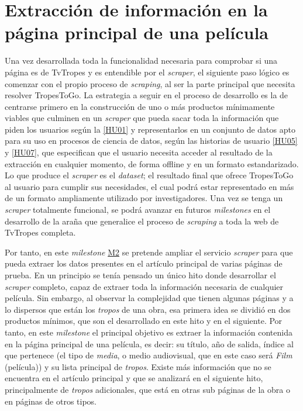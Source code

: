 \section{Extracción de información en la página principal de una película}
Una vez desarrollada toda la funcionalidad necesaria para comprobar si una
página es de TvTropes y es entendible por el \textit{scraper}, el siguiente paso
lógico es comenzar con el propio proceso de \textit{scraping}, al ser la parte
principal que necesita resolver TropesToGo. La estrategia a seguir en el proceso
de desarrollo es la de centrarse primero en la construcción de uno o más
productos mínimamente viables que culminen en un \textit{scraper} que pueda
sacar toda la información que piden los usuarios según la
\href{https://github.com/jlgallego99/TropesToGo/issues/6}{[HU01]} y
representarlos en un conjunto de datos apto para su uso en procesos de ciencia
de datos, según las historias de usuario
\href{https://github.com/jlgallego99/TropesToGo/issues/30}{[HU05]} y
\href{https://github.com/jlgallego99/TropesToGo/issues/46}{[HU07]}, que
especifican que el usuario necesita acceder al resultado de la extracción en
cualquier momento, de forma offline y en un formato estandarizado. Lo que
produce el \textit{scraper} es el \textit{dataset}; el resultado final que
ofrece TropesToGo al usuario para cumplir sus necesidades, el cual podrá estar
representado en más de un formato ampliamente utilizado por investigadores. Una
vez se tenga un \textit{scraper} totalmente funcional, se podrá avanzar en
futuros \textit{milestones} en el desarrollo de la araña que generalice el
proceso de \textit{scraping} a toda la web de TvTropes completa. 

Por tanto, en este \textit{milestone}
\href{https://github.com/jlgallego99/TropesToGo/milestone/3}{M2} se pretende
ampliar el servicio \textit{scraper} para que pueda extraer los datos presentes
en el artículo principal de varias páginas de prueba. En un principio se tenía
pensado un único hito donde desarrollar el \textit{scraper} completo, capaz de
extraer toda la información necesaria de cualquier película. Sin embargo, al
observar la complejidad que tienen algunas páginas y a lo dispersos que están
los \textit{tropos} de una obra, esa primera idea se dividió en dos productos
mínimos, que son el desarrollado en este hito y en el siguiente. Por tanto, en
este \textit{milestone} el principal objetivo es extraer la información
contenida en la página principal de una película, es decir: su título, año de
salida, índice al que pertenece (el tipo de \textit{media}, o medio audiovisual,
que en este caso será \textit{Film} (película)) y su lista principal de
\textit{tropos}. Existe más información que no se encuentra en el artículo
principal y que se analizará en el siguiente hito, principalmente de
\textit{tropos} adicionales, que está en otras sub páginas de la obra o en
páginas de otros tipos.

